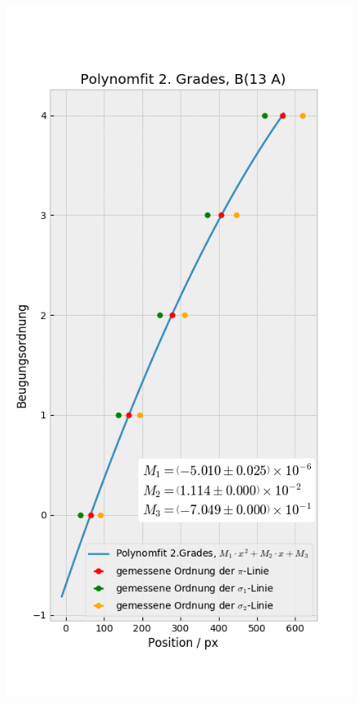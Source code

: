 \begin{landscape}
\begin{figure}
            \includegraphics[width=.45\paperwidth]{Auswertung/scatterorder/sco_13A}
          \end{figure}


\end{landscape}
